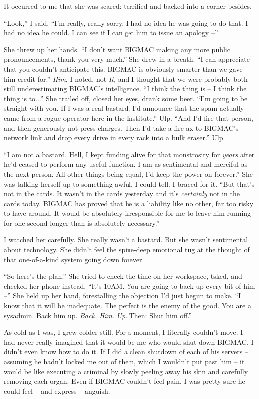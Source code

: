 It occurred to me that she was scared: terrified and backed into a 
corner besides.

“Look,” I said. “I'm really, really sorry. I had no idea he was 
going to do that. I had no idea he could. I can see if I can get him to 
issue an apology --”

She threw up her hands. “I don't want BIGMAC making any more public 
pronouncements, thank you very much.” She drew in a breath. “I can 
appreciate that you couldn't anticipate this. BIGMAC is obviously 
smarter than we gave him credit for.” \emph{Him}, I noted, not 
\emph{It,} and I thought that we were probably both still 
underestimating BIGMAC's intelligence. “I think the thing is -- I 
think the thing is to...” She trailed off, closed her eyes, drank 
some beer. “I'm going to be straight with you. If I was a real 
bastard, I'd announce that the spam actually came from a rogue operator 
here in the Institute.” Ulp. “And I'd fire that person, and then 
generously not press charges. Then I'd take a fire-ax to BIGMAC's 
network link and drop every drive in every rack into a bulk eraser.” 
Ulp.

“I am not a bastard. Hell, I kept funding alive for that monstrosity 
for \emph{years} after he'd ceased to perform any useful function. I am 
as sentimental and merciful as the next person. All other things being 
equal, I'd keep the power on forever.” She was talking herself up to 
something awful, I could tell. I braced for it. “But that's not in 
the cards. It wasn't in the cards yesterday and it's \emph{certainly} 
not in the cards today. BIGMAC has proved that he is a liability like 
no other, far too risky to have around. It would be absolutely 
irresponsible for me to leave him running for one second longer than is 
absolutely necessary.”

I watched her carefully. She really wasn't a bastard. But she wasn't 
sentimental about technology. She didn't feel the spine-deep emotional 
tug at the thought of that one-of-a-kind system going down forever.

“So here's the plan.” She tried to check the time on her workspace, 
tsked, and checked her phone instead. “It's 10AM. You are going to 
back up every bit of him --” She held up her hand, forestalling the 
objection I'd just begun to make. “I know that it will be inadequate. 
The perfect is the enemy of the good. You are a sysadmin. Back him up. 
\emph{Back.} \emph{Him}. \emph{Up}. Then: Shut him off.”

As cold as I was, I grew colder still. For a moment, I literally 
couldn't move. I had never really imagined that it would be me who 
would shut down BIGMAC. I didn't even know how to do it. If I did a 
clean shutdown of each of his servers -- assuming he hadn't locked me 
out of them, which I wouldn't put past him -- it would be like 
executing a criminal by slowly peeling away his skin and carefully 
removing each organ. Even if BIGMAC couldn't feel pain, I was pretty 
sure he could feel -- and express -- anguish.

